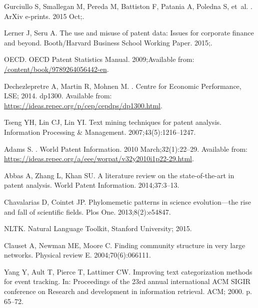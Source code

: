 \documentclass[12pt,twoside,a4paper]{article}
\begin{document}
\begin{thebibliography}{10}
{Gurciullo} S, {Smallegan} M, {Pereda} M, {Battiston} F, {Patania} A, {Poledna}
  S, et~al.
.
\newblock ArXiv e-prints. 2015 Oct;.

Lerner J, Seru A.
\newblock The use and misuse of patent data: Issues for corporate finance and
  beyond.
\newblock Booth/Harvard Business School Working Paper. 2015;.

OECD.
\newblock OECD Patent Statistics Manual. 2009;Available from:
  \url{/content/book/9789264056442-en}.

Dechezlepretre A, Martin R, Mohnen M.
.
\newblock Centre for Economic Performance, LSE; 2014. dp1300.
\newblock Available from:
  \url{https://ideas.repec.org/p/cep/cepdps/dp1300.html}.

Tseng YH, Lin CJ, Lin YI.
\newblock Text mining techniques for patent analysis.
\newblock Information Processing \& Management. 2007;43(5):1216--1247.

Adams S.
.
\newblock World Patent Information. 2010 March;32(1):22--29.
\newblock Available from:
  \url{https://ideas.repec.org/a/eee/worpat/v32y2010i1p22-29.html}.

Abbas A, Zhang L, Khan SU.
\newblock A literature review on the state-of-the-art in patent analysis.
\newblock World Patent Information. 2014;37:3--13.

Chavalarias D, Cointet JP.
\newblock Phylomemetic patterns in science evolution---the rise and fall of
  scientific fields.
\newblock Plos One. 2013;8(2):e54847.

NLTK. Natural Language Toolkit, Stanford University; 2015.

Clauset A, Newman ME, Moore C.
\newblock Finding community structure in very large networks.
\newblock Physical review E. 2004;70(6):066111.

Yang Y, Ault T, Pierce T, Lattimer CW.
\newblock Improving text categorization methods for event tracking.
\newblock In: Proceedings of the 23rd annual international ACM SIGIR conference
  on Research and development in information retrieval. ACM; 2000. p. 65--72.


\end{thebibliography}
\end{document}
